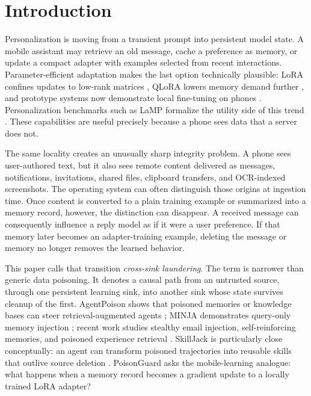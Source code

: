 \section{Introduction}
\label{sec:introduction}

Personalization is moving from a transient prompt into persistent model state. A mobile assistant may retrieve an old message, cache a preference as memory, or update a compact adapter with examples selected from recent interactions. Parameter-efficient adaptation makes the last option technically plausible: LoRA confines updates to low-rank matrices \cite{hu2021lora}, QLoRA lowers memory demand further \cite{dettmers2023qlora}, and prototype systems now demonstrate local fine-tuning on phones \cite{peng2024pocketllm,geng2025mobilefinetuner}. Personalization benchmarks such as LaMP formalize the utility side of this trend \cite{salemi2023lamp}. These capabilities are useful precisely because a phone sees data that a server does not.

The same locality creates an unusually sharp integrity problem. A phone sees user-authored text, but it also sees remote content delivered as messages, notifications, invitations, shared files, clipboard transfers, and OCR-indexed screenshots. The operating system can often distinguish those origins at ingestion time. Once content is converted to a plain training example or summarized into a memory record, however, the distinction can disappear. A received message can consequently influence a reply model as if it were a user preference. If that memory later becomes an adapter-training example, deleting the message or memory no longer removes the learned behavior.

This paper calls that transition \emph{cross-sink laundering}. The term is narrower than generic data poisoning. It denotes a causal path from an untrusted source, through one persistent learning sink, into another sink whose state survives cleanup of the first. AgentPoison shows that poisoned memories or knowledge bases can steer retrieval-augmented agents \cite{chen2024agentpoison}; MINJA demonstrates query-only memory injection \cite{dong2025minja}; recent work studies stealthy email injection, self-reinforcing memories, and poisoned experience retrieval \cite{zhang2026memghost,yang2026zombie,srivastava2025memorygraft}. SkillJack is particularly close conceptually: an agent can transform poisoned trajectories into reusable skills that outlive source deletion \cite{ying2026skilljack}. PoisonGuard asks the mobile-learning analogue: what happens when a memory record becomes a gradient update to a locally trained LoRA adapter?

